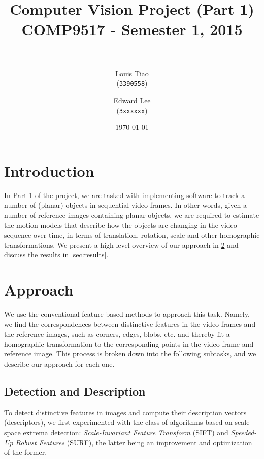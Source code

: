 \documentclass[11pt]{article} %
\title{	
\normalfont \normalsize 
\horrule{0.5pt} \\[0.4cm] %
\Large Computer Vision Project (Part 1) \\ [0.1cm] %
\large COMP9517 - Semester 1, 2015 \\ [0.2cm]
\horrule{2pt} \\[0.5cm] %
}
\author{
	Louis Tiao \\
	(\texttt{3390558})
	\and
	Edward Lee\\
	(\texttt{3xxxxxx})
} %
\date{\normalsize\today} %
\theoremstyle{plain}
\theoremstyle{definition}
\theoremstyle{remark}
\numberwithin{equation}{section} %
\numberwithin{figure}{section} %
\numberwithin{table}{section} %
\begin{document}
\maketitle %


\section{Introduction}

In Part 1 of the project, we are tasked with implementing software to track a number 
of (planar) objects in sequential video frames. In other words, given a number of 
reference images containing planar objects, we are required to estimate the motion 
models that describe how the objects are changing in the video sequence over time, 
in terms of translation, rotation, scale and other homographic transformations. We 
present a high-level overview of our approach in \cref{sec:approach} and discuss the 
results in \cref{sec:results}.

\section{Approach} \label{sec:approach}

We use the conventional feature-based methods to approach this task. Namely, we find
the correspondences between distinctive features in the video frames and the reference 
images, such as corners, edges, blobs, etc. and thereby fit a homographic transformation 
to the corresponding points in the video frame and reference image. This process is
broken down into the following subtasks, and we describe our approach for each one.

\subsection{Detection and Description}

To detect distinctive features in images and compute their description vectors 
(descriptors), we first experimented with the class of algorithms based on scale-space 
extrema detection: \emph{Scale-Invariant Feature Transform} (SIFT) and \emph{Speeded-Up 
Robust Features} (SURF), the latter being an improvement and optimization of the former. 
\end{document}
